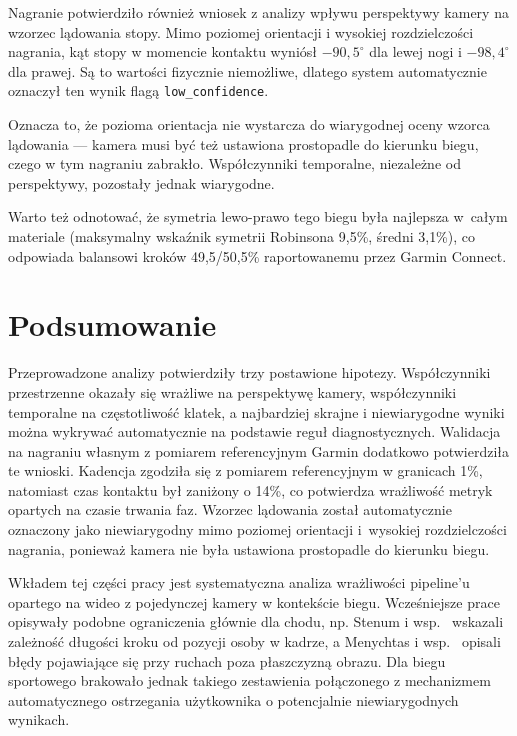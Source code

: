 Nagranie potwierdziło również wniosek z analizy wpływu perspektywy kamery na wzorzec lądowania stopy. Mimo poziomej orientacji i wysokiej rozdzielczości nagrania, kąt stopy w momencie kontaktu wyniósł $-90{,}5^\circ$ dla lewej nogi i $-98{,}4^\circ$ dla prawej. Są to wartości fizycznie niemożliwe, dlatego system automatycznie oznaczył ten wynik flagą \texttt{low\_confidence}.

Oznacza to, że pozioma orientacja nie wystarcza do wiarygodnej oceny wzorca lądowania --- kamera musi być też ustawiona prostopadle do kierunku biegu, czego w tym nagraniu zabrakło. Współczynniki temporalne, niezależne od perspektywy, pozostały jednak wiarygodne.


Warto też odnotować, że symetria lewo-prawo tego biegu była najlepsza w~całym materiale (maksymalny wskaźnik symetrii Robinsona 9{,}5\%, średni 3{,}1\%), co odpowiada balansowi kroków 49,5/50,5\% raportowanemu przez Garmin Connect. 
\section{Podsumowanie}
\label{sec:podsumowanie-wrazliwosc}

Przeprowadzone analizy potwierdziły trzy postawione hipotezy. Współczynniki przestrzenne okazały się wrażliwe na perspektywę kamery, współczynniki temporalne na częstotliwość klatek, a najbardziej skrajne i niewiarygodne wyniki można wykrywać automatycznie na podstawie reguł diagnostycznych. Walidacja na nagraniu własnym z pomiarem referencyjnym Garmin dodatkowo potwierdziła te wnioski. Kadencja zgodziła się z pomiarem referencyjnym w granicach 1\%, natomiast czas kontaktu był zaniżony o 14\%, co potwierdza wrażliwość metryk opartych na czasie trwania faz. Wzorzec lądowania został automatycznie oznaczony jako niewiarygodny mimo poziomej orientacji i~wysokiej rozdzielczości nagrania, ponieważ kamera nie była ustawiona prostopadle do kierunku biegu.

Wkładem tej części pracy jest systematyczna analiza wrażliwości pipeline'u opartego na wideo z pojedynczej kamery w kontekście biegu. Wcześniejsze prace opisywały podobne ograniczenia głównie dla chodu, np. Stenum i wsp.~\cite{stenum2021} wskazali zależność długości kroku od pozycji osoby w kadrze, a Menychtas i wsp.~\cite{menychtas2023} opisali błędy pojawiające się przy ruchach poza płaszczyzną obrazu. Dla biegu sportowego brakowało jednak takiego zestawienia połączonego z mechanizmem automatycznego ostrzegania użytkownika o potencjalnie niewiarygodnych wynikach.
